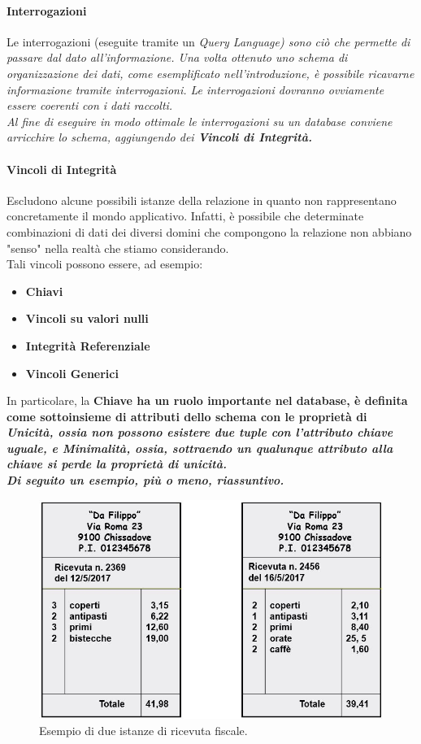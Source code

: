 \documentclass[11pt]{article} %
\begin{document}
\paragraph{Interrogazioni} Le interrogazioni (eseguite tramite un \it Query Language\rm) sono ciò che permette di passare dal dato all'informazione. Una volta ottenuto uno schema di organizzazione dei dati, come esemplificato nell'introduzione, è possibile ricavarne informazione tramite interrogazioni. Le interrogazioni dovranno ovviamente essere coerenti con i dati raccolti.\\
Al fine di eseguire in modo ottimale le interrogazioni su un \it database \rm conviene arricchire lo schema, aggiungendo dei \bf Vincoli di Integrità\rm.
\paragraph{Vincoli di Integrità} Escludono alcune possibili istanze della relazione in quanto non rappresentano concretamente il mondo applicativo. Infatti, è possibile che determinate combinazioni di dati dei diversi domini che compongono la relazione non abbiano "senso" nella realtà che stiamo considerando.\\
Tali vincoli possono essere, ad esempio:
\begin{itemize}
\item \bf Chiavi \rm
\item \bf Vincoli su valori nulli \rm
\item \bf Integrità Referenziale \rm
\item \bf Vincoli Generici \rm
\end{itemize}
\noindent In particolare, la \bf Chiave \rm ha un ruolo importante nel database, è definita come sottoinsieme di attributi dello schema con le proprietà di \it Unicità\rm, ossia non possono esistere due tuple con l'attributo chiave uguale, e \it Minimalità\rm, ossia, sottraendo un qualunque attributo alla chiave si perde la proprietà di unicità.\\
Di seguito un esempio, più o meno, riassuntivo.
\begin{figure}[htbp]
		\includegraphics{IstanzeRicevutaFiscale.jpg}
	\caption{Esempio di due istanze di ricevuta fiscale.}
\end{figure}
\end{document}
